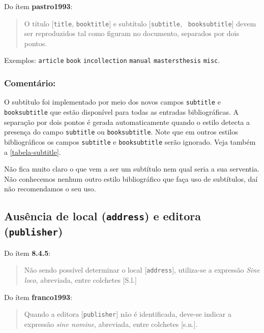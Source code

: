 \documentclass[a4paper]{ltxdoc}
\begin{document}
Do ítem \textbf{pastro1993}\cite{NBR6023:2000}:
\begin{quote}
O título [\texttt{title}, \texttt{booktitle}] e subtítulo [\texttt{subtitle}, \texttt{
booksubtitle}] devem ser reproduzidos tal como figuram no documento, separados
por dois pontos.
\end{quote}

Exemplos:
\texttt{article}\cite{ribeiro1998}
\texttt{book}
\cite{houaiss1996,torelly1991,michalany1981,passos1995,pastro1993,franco1993} 
\texttt{incollection}\cite{romano1996} 
\texttt{manual}\cite{NBR6023:2000,secretaria1989,museu1997,moreira1997,geografico1986,brasileira1988}
\texttt{mastersthesis}\cite{araujo1986}
\texttt{misc}\cite{birds1998}.

\subsubsection{Comentário:}
O subtítulo foi implementado por meio dos novos campos \texttt{subtitle}
e \texttt{booksubtitle} que estão disponível para todas as entradas bibliográficas.
A separação por dois pontos é gerada automaticamente quando o estilo detecta a
presença do campo \texttt{subtitle} ou \texttt{booksubtitle}. Note que em outros
estilos bibliográficos os campos \texttt{subtitle} e \texttt{booksubtitle} serão
ignorado. Veja também a \autoref{tabela-subtitle}.

Não fica muito claro o que vem a ser um subtítulo nem qual seria a sua
serventia. Não conhecemos nenhum outro estilo bibliográfico que faça uso de
subtítulos, daí não recomendamos o seu uso.

\subsection{Ausência de local (\texttt{address}) e editora (\texttt{publisher})}

Do ítem \textbf{8.4.5}\cite{NBR6023:2000}:
\begin{quote}
Não sendo possível determinar o local [\texttt{address}], utiliza-se a expressão \emph{Sine loco},
abreviada, entre colchetes [S.l.]
\end{quote}

Do ítem \textbf{franco1993}\cite{NBR6023:2000}:
\begin{quote}
Quando a editora [\texttt{publisher}] não é identificada, deve-se indicar a expressão
\emph{sine nomine}, abreviada, entre colchetes [s.n.].
\end{quote}
\end{document}
